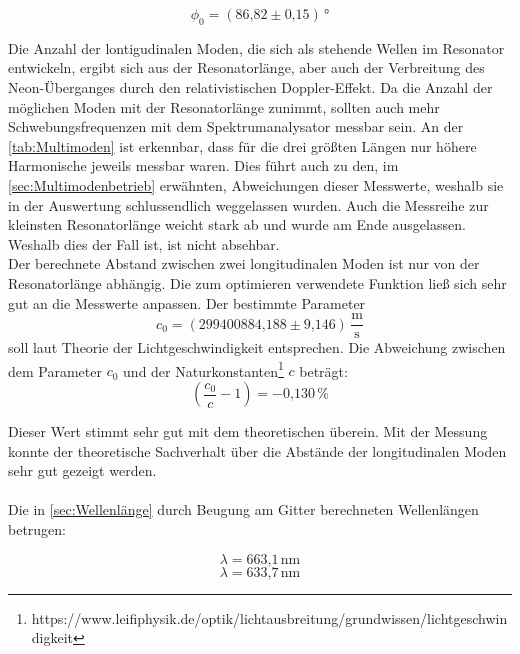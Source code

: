 \begin{equation}
\phi_0 = (\text{86,82} \pm \text{0,15})\,\text{°}
\end{equation}


Die Anzahl der lontigudinalen Moden, die sich als stehende Wellen im Resonator entwickeln, ergibt sich aus der Resonatorlänge, aber auch der Verbreitung des Neon-Überganges durch den relativistischen Doppler-Effekt. Da die Anzahl der möglichen Moden mit der Resonatorlänge zunimmt, sollten auch mehr Schwebungsfrequenzen mit dem Spektrumanalysator messbar sein. An der \autoref{tab:Multimoden} ist erkennbar, dass für die drei größten Längen nur höhere Harmonische jeweils messbar waren. Dies führt auch zu den, im \autoref{sec:Multimodenbetrieb} erwähnten, Abweichungen dieser Messwerte, weshalb sie in der Auswertung schlussendlich weggelassen wurden. Auch die Messreihe zur kleinsten Resonatorlänge weicht stark ab und wurde am Ende ausgelassen. Weshalb dies der Fall ist, ist nicht absehbar.\\
Der berechnete Abstand zwischen zwei longitudinalen Moden ist nur von der Resonatorlänge abhängig. Die zum optimieren verwendete Funktion ließ sich sehr gut an die Messwerte anpassen. Der bestimmte Parameter
\begin{equation}
c_0 = (\text{299400884,188} \pm \text{9,146})\, \frac{\text{m}}{\text{s}}
\end{equation}
soll laut Theorie der Lichtgeschwindigkeit entsprechen. Die Abweichung zwischen dem Parameter $c_0$ und der Naturkonstanten\footnote{https://www.leifiphysik.de/optik/lichtausbreitung/grundwissen/lichtgeschwindigkeit} $c$ beträgt:
\begin{equation}
(\frac{c_0}{c} -1)= -\text{0,130}\,\%
\end{equation}

Dieser Wert stimmt sehr gut mit dem theoretischen überein. Mit der Messung konnte der theoretische Sachverhalt über die Abstände der longitudinalen Moden sehr gut gezeigt werden.\\
\\
Die in \autoref{sec:Wellenlänge} durch Beugung am Gitter berechneten Wellenlängen betrugen:

\begin{equation}
\lambda = \text{663,1}\,\text{nm}
\label{eq:diskussionlambda1}
\end{equation}
\begin{equation}
\lambda = \text{633,7}\,\text{nm}
\label{eq:diskussionlambda2}
\end{equation}

